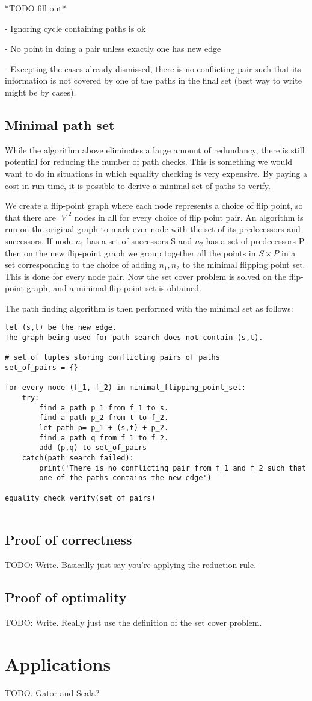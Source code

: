 \documentclass{article}
\begin{document}
*TODO fill out*

- Ignoring cycle containing paths is ok

- No point in doing a pair unless exactly one has new edge

- Excepting the cases already dismissed, there is no conflicting pair such that its information is not covered by one of the paths in the final set (best way to write might be by cases).

\subsection{Minimal path set}
While the algorithm above eliminates a large amount of redundancy, there is still potential for reducing the number of path checks. This is something we would want to do in situations in which equality checking is very expensive. By paying a cost in run-time, it is possible to derive a minimal set of paths to verify.

We create a flip-point graph where each node represents a choice of flip point, so that there are $|V|^2$ nodes in all for every choice of flip point pair.
An algorithm is run on the original graph to mark ever node with the set of its predecessors and successors.
If node $n_1$ has a set of successors S and $n_2$ has a set of predecessors P then on the new flip-point graph we group together all the points in $S\times P$ in a set corresponding to the choice of adding $n_1, n_2$ to the minimal flipping point set. This is done for every node pair.
Now the set cover problem is solved on the flip-point graph, and a minimal flip point set is obtained.

The path finding algorithm is then performed with the minimal set as follows:

\begin{verbatim}
let (s,t) be the new edge.
The graph being used for path search does not contain (s,t).

# set of tuples storing conflicting pairs of paths
set_of_pairs = {}

for every node (f_1, f_2) in minimal_flipping_point_set:
    try:
        find a path p_1 from f_1 to s.
        find a path p_2 from t to f_2.
        let path p= p_1 + (s,t) + p_2.
        find a path q from f_1 to f_2.
        add (p,q) to set_of_pairs    
    catch(path search failed):
        print('There is no conflicting pair from f_1 and f_2 such that
        one of the paths contains the new edge')

equality_check_verify(set_of_pairs)
            
\end{verbatim}

\subsection{Proof of correctness}
TODO: Write. Basically just say you're applying the reduction rule.

\subsection{Proof of optimality}
TODO: Write. Really just use the definition of the set cover problem.

\section{Applications}

TODO. Gator and Scala?
\end{document}
